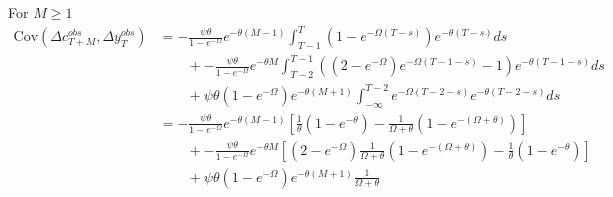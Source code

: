 For $M \geq 1$
\begin{align*}
\mathrm{Cov}(\Delta c_{T+M}^{obs},\Delta y_{T}^{obs}) 
&=-\frac{\psi \theta}{1-e^{-\Omega}} e^{-\theta (M-1)} \int_{T-1}^{T}  ( 1 - e^{-\Omega (T-s)} ) e^{-\theta (T-s)}ds \\
& \qquad +  -\frac{\psi \theta}{1-e^{-\Omega}}  e^{-\theta M} \int_{T-2}^{T-1}\left( (2-e^{-\Omega}) e^{-\Omega (T-1-s)} -1  \right)e^{-\theta (T-1-s)}ds \\
& \qquad +  \psi \theta (1-e^{-\Omega}) e^{-\theta (M+1)} \int_{-\infty}^{T-2}  e^{-\Omega (T-2-s)} e^{-\theta (T-2-s)}ds \\
&=-\frac{\psi \theta}{1-e^{-\Omega}} e^{-\theta (M-1)} \left[ \frac{1}{\theta}(1-e^{-\theta}) - \frac{1}{\Omega + \theta}(1-e^{-(\Omega+\theta)})  \right]\\
& \qquad +  -\frac{\psi \theta}{1-e^{-\Omega}}  e^{-\theta M} \left[ (2-e^{-\Omega})\frac{1}{\Omega + \theta}(1-e^{-(\Omega+\theta)})  - \frac{1}{\theta}(1-e^{-\theta})\right] \\
& \qquad +  \psi \theta (1-e^{-\Omega}) e^{-\theta (M+1)}\frac{1}{\Omega + \theta}
\end{align*}




